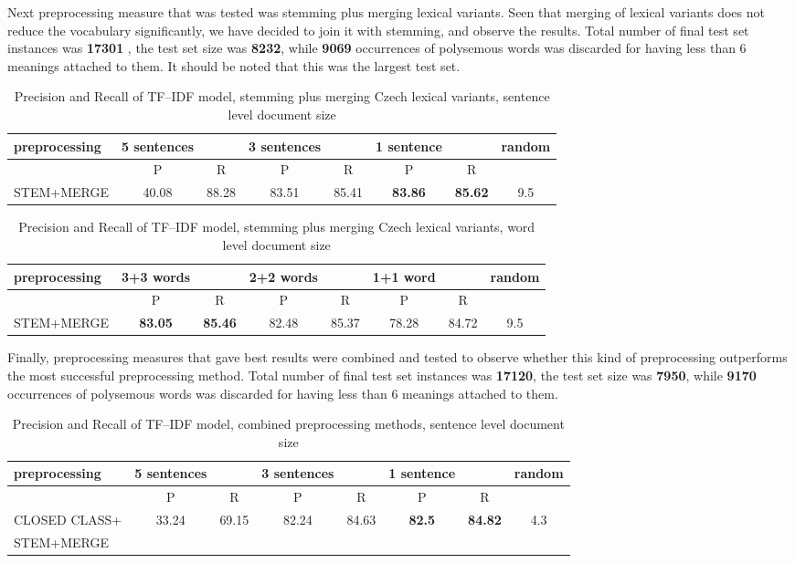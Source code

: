Next preprocessing measure that was tested was stemming plus merging lexical variants. Seen that
merging of lexical variants does not reduce the vocabulary significantly, we have decided to join it
with stemming, and observe the results. Total number of final test set instances was  \textbf{17301} , the test set size was \textbf{8232}, while \textbf{9069} occurrences of polysemous words was discarded for having less than 6 meanings attached to them. It should be noted that this was the largest test set.

\begin{table}[h!]
\begin{tabular}{ l | c c | c c | c c | c}
   preprocessing &  5 sentences && 3 sentences && 1 sentence  && random\\
\hline
	& P  &  R & P  &  R & P  &  R &\\
\hline\hline
STEM+MERGE & 40.08  & 88.28  & 83.51  & 85.41  & \textbf{83.86}  &  \textbf{85.62} & 9.5  \\
\end{tabular}
\caption{Precision and Recall of TF--IDF model, stemming plus merging Czech lexical variants, sentence level document size}
\end{table}

\begin{table}[h!]
\begin{tabular}{ l | c c | c c | c c | c}
   preprocessing &  3+3 words && 2+2 words && 1+1 word  && random\\
\hline\hline
	& P  &  R & P  &  R & P  &  R &\\
\hline
STEM+MERGE & \textbf{ 83.05}  & \textbf{85.46}  & 82.48 &  85.37 & 78.28  &  84.72 & 9.5\\
\end{tabular}
\caption{Precision and Recall of TF--IDF model, stemming plus merging Czech lexical variants, word level document size}
\end{table}

Finally, preprocessing measures that gave best results were combined and tested to observe whether
this kind of preprocessing outperforms the most successful preprocessing method. Total number of final test set instances was  \textbf{17120}, the test set size was \textbf{7950}, while \textbf{9170} occurrences of polysemous words was discarded for having less than 6 meanings attached to them.

\begin{table}[h!]
\begin{tabular}{ l | c c | c c | c c | c}
   preprocessing &  5 sentences && 3 sentences && 1 sentence  && random\\
\hline
	& P  &  R & P  &  R & P  &  R &\\
\hline\hline
CLOSED CLASS+ & 33.24  & 69.15  & 82.24  & 84.63 & \textbf{82.5} & \textbf{84.82} & 4.3  \\
STEM+MERGE &&&&&&&\\
\end{tabular}
\caption{Precision and Recall of TF--IDF model, combined preprocessing methods, sentence level document size}
\end{table}

